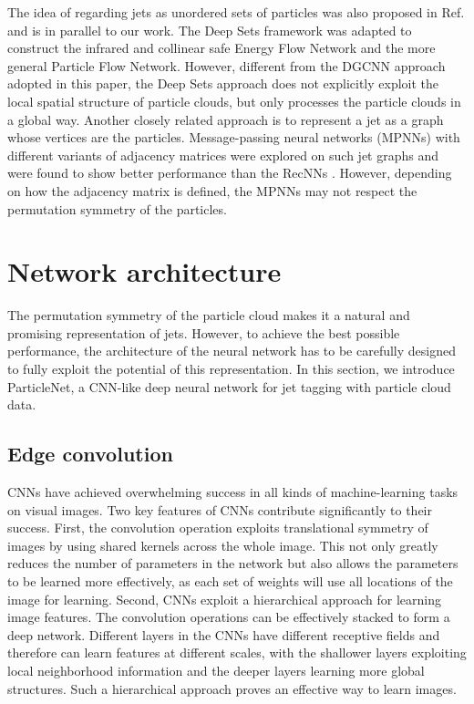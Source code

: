 \documentclass[aps,prd,longbibliography,reprint,amsmath,amssymb,amsfonts]{revtex4-1}
\begin{document}
The idea of regarding jets as unordered sets of particles was also proposed in Ref. \cite{Komiske:2018cqr} and is in parallel to our work. The Deep Sets framework \cite{zaheer2017deep} was adapted to construct the infrared and collinear safe Energy Flow Network and the more general Particle Flow Network. However, different from the DGCNN \cite{DBLP:journals/corr/abs-1801-07829} approach adopted in this paper, the Deep Sets approach does not explicitly exploit the local spatial structure of particle clouds, but only processes the particle clouds in a global way.
Another closely related approach is to represent a jet as a graph whose vertices are the particles. Message-passing neural networks (MPNNs) with different variants of adjacency matrices were explored on such jet graphs and were found to show better performance than the RecNNs \cite{henrionneural}. However, depending on how the adjacency matrix is defined, the MPNNs may not respect the permutation symmetry of the particles.

 \section{Network architecture}
\label{sec:model}

The permutation symmetry of the particle cloud makes it a natural and promising representation of jets. However, to achieve the best possible performance, the architecture of the neural network has to be carefully designed to fully exploit the potential of this representation. In this section, we introduce ParticleNet, a CNN-like deep neural network for jet tagging with particle cloud data. 

\subsection{Edge convolution}

\newcommand\BigBox{\vcenter{\hbox{\scalebox{2}{$\Box$}}}}
\newcommand\bigsquare{\mathop{\BigBox}\limits}
\newcommand\MedBox{\vcenter{\hbox{\scalebox{1.2}{$\Box$}}}}

CNNs have achieved overwhelming success in all kinds of machine-learning tasks on visual images. Two key features of CNNs contribute significantly to their success. First, the convolution operation exploits translational symmetry of images by using shared kernels across the whole image. This not only greatly reduces the number of parameters in the network but also allows the parameters to be learned more effectively, as each set of weights will use all locations of the image for learning. Second, CNNs exploit a hierarchical approach \cite{zeiler2014visualizing} for learning image features. The convolution operations can be effectively stacked to form a deep network. Different layers in the CNNs have different receptive fields and therefore can learn features at different scales, with the shallower layers exploiting local neighborhood information and the deeper layers learning more global structures. Such a hierarchical approach proves an effective way to learn images.
\end{document}

